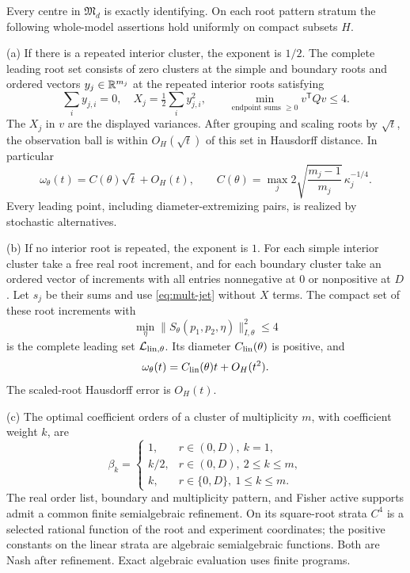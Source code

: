 \begin{theorem}\label{thm:mult-atlas}
Every centre in $\mathfrak M_d$ is exactly identifying. On each root
pattern stratum the following whole-model assertions hold uniformly on
compact subsets $H$.

\smallskip\noindent
\textup{(a)} If there is a repeated interior cluster, the exponent is
$1/2$. The complete leading root set consists of zero clusters at the
simple and boundary roots and ordered vectors $y_j\in\mathbb R^{m_j}$ at the
repeated interior roots satisfying
\begin{equation}\label{eq:mult-leading}
 \sum_i y_{j,i}=0,\quad X_j=\tfrac12\sum_i y_{j,i}^2,
 \qquad \min_{\text{endpoint sums }\ge0}v^{\mathsf T}Qv\le4.
\end{equation}
The $X_j$ in $v$ are the displayed variances. After grouping and scaling
roots by $\sqrt t$, the observation ball is within $O_H(\sqrt t)$ of
this set in Hausdorff distance. In particular
\begin{equation}\label{eq:mult-C}
 \omega_\theta(t)=C(\theta)\sqrt t+O_H(t),\qquad
 C(\theta)=\max_j 2\sqrt{\frac{m_j-1}{m_j}}\,\kappa_j^{-1/4}.
\end{equation}
Every leading point, including diameter-extremizing pairs, is realized
by stochastic alternatives.

\smallskip\noindent
\textup{(b)} If no interior root is repeated, the exponent is $1$.
For each simple interior cluster take a free real root increment, and
for each boundary cluster take an ordered vector of increments with
all entries nonnegative at $0$ or nonpositive at $D$. Let $s_j$ be
their sums and use \eqref{eq:mult-jet} without $X$ terms. The compact
set of these root increments with
\begin{equation}\label{eq:linear-leading}
 \min_\eta\|S_\theta(p_1,p_2,\eta)\|_{I,\theta}^2\le4
\end{equation}
is the complete leading set $\mathcal L_{\rm lin,\theta}$. Its diameter
$C_{\rm lin}(\theta)$ is positive, and
\[
 \omega_\theta(t)=C_{\rm lin}(\theta)t+O_H(t^2).
\]
The scaled-root Hausdorff error is $O_H(t)$.

\smallskip\noindent
\textup{(c)} The optimal coefficient orders of a cluster of multiplicity
$m$, with coefficient weight $k$, are
\begin{equation}\label{eq:explicit-orders}
 \beta_k=\begin{cases}
 1,&r\in(0,D),\ k=1,\\
 k/2,&r\in(0,D),\ 2\le k\le m,\\
 k,&r\in\{0,D\},\ 1\le k\le m.
 \end{cases}
\end{equation}
The real order list, boundary and multiplicity pattern, and Fisher
active supports admit a common finite semialgebraic refinement. On
its square-root strata $C^4$ is a selected rational function of the
root and experiment coordinates; the positive constants on the linear
strata are algebraic semialgebraic functions. Both are Nash after
refinement. Exact algebraic evaluation uses finite programs.
\end{theorem}
